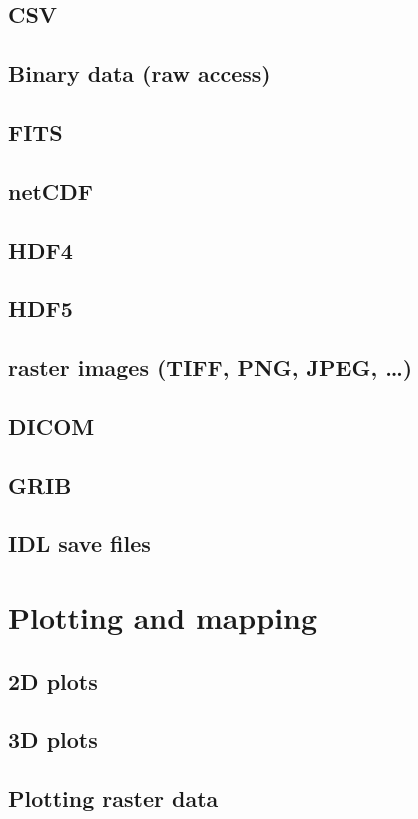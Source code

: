 \documentclass[10pt,titleauthor,openany]{mwbk}
\begin{document}
  \section{CSV}
  
  \section{Binary data (raw access)}
  \section{FITS}
  \section{netCDF}
  
  \section{HDF4}
  
  \section{HDF5}
  \section{raster images (TIFF, PNG, JPEG, \ldots)}
  \section{DICOM}
  \section{GRIB}
  
  \section{IDL save files}

  \chapter{Plotting and mapping}
  \section{2D plots}
  
  \section{3D plots}
  
  \section{Plotting raster data}
\end{document}
